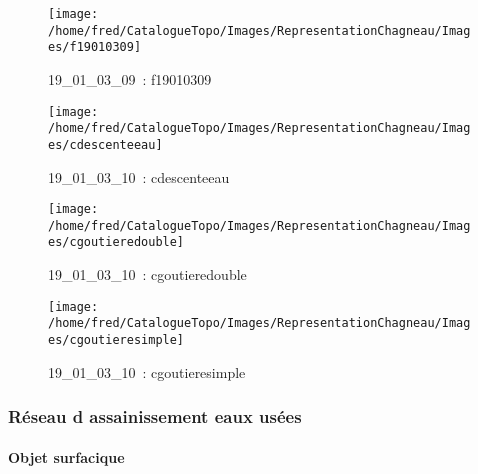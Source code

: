 \documentclass[12pt,titlepage]{book}
\begin{document}
\begin{figure}[h!]
\begin{minipage}[t]{3cm}
  \end{minipage}
  \begin{minipage}[t]{3cm}
    \begin{center}
      \texttt{[image: /home/fred/CatalogueTopo/Images/RepresentationChagneau/Images/f19010309]}
      \caption[~19\_01\_03\_09]{\small{19\_01\_03\_09~:} \tiny{f19010309}}\label{f19010309}
    \end{center}
  \end{minipage}
  \begin{minipage}[t]{3cm}
    \begin{center}
      \texttt{[image: /home/fred/CatalogueTopo/Images/RepresentationChagneau/Images/cdescenteeau]}
      \caption[~19\_01\_03\_10]{\small{19\_01\_03\_10~:} \tiny{cdescenteeau}}\label{cdescenteeau}
    \end{center}
  \end{minipage}
  \begin{minipage}[t]{3cm}
    \begin{center}
      \texttt{[image: /home/fred/CatalogueTopo/Images/RepresentationChagneau/Images/cgoutieredouble]}
      \caption[~19\_01\_03\_10]{\small{19\_01\_03\_10~:} \tiny{cgoutieredouble}}\label{cgoutieredouble}
    \end{center}
  \end{minipage}
  \begin{minipage}[t]{3cm}
    \begin{center}
      \texttt{[image: /home/fred/CatalogueTopo/Images/RepresentationChagneau/Images/cgoutieresimple]}
      \caption[~19\_01\_03\_10]{\small{19\_01\_03\_10~:} \tiny{cgoutieresimple}}\label{cgoutieresimple}
    \end{center}
  \end{minipage}
\end{figure}

\subsubsection{\large Réseau d assainissement eaux usées}
\paragraph{Objet surfacique}
\noindent
\vspace{\baselineskip}
\end{document}
